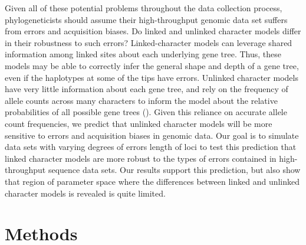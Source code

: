 Given all of these potential problems throughout the data collection process,
phylogeneticists should assume their high-throughput genomic data set suffers
from errors and acquisition biases.
Do linked and unlinked character models differ in their robustness to such
errors?
Linked-character models can leverage shared information among linked sites
about each underlying gene tree.
Thus, these models may be able to correctly infer the general shape and depth
of a gene tree, even if the haplotypes at some of the tips have errors.
Unlinked character models have very little information about each gene tree,
and rely on the frequency of allele counts across many characters to inform the
model about the relative probabilities of all possible gene trees
().
Given this reliance on accurate allele count frequencies, we predict that
unlinked character models will be more sensitive to errors and acquisition
biases in genomic data.
Our goal is to simulate data sets with varying degrees of errors length of loci
to test this prediction that linked character models are more robust to the
types of errors contained in high-throughput sequence data sets.
Our results support this prediction, but also show that region of parameter
space where the differences between linked and unlinked character models is
revealed is quite limited.




\section{Methods}


